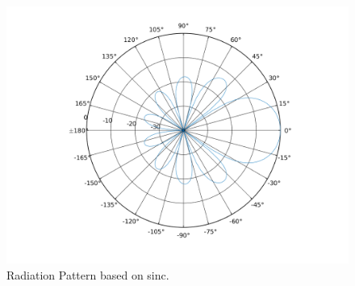 \begin{figure}[H]
	\centering
	\includegraphics[scale=0.6]{figures/radiationpattern.png}
	\caption{Radiation Pattern based on sinc.}
	\label{fig:radiationpattern}
\end{figure}
